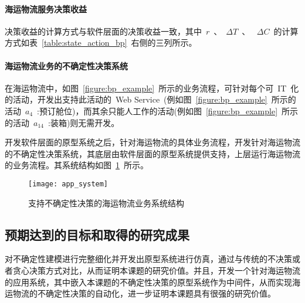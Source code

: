 \paragraph{海运物流服务决策收益}

决策收益的计算方式与软件层面的决策收益一致，其中~$r$~、~$\Delta T$~、 ~$\Delta C$~的计算方式如表~\ref{table:state_action_bp}~右侧的三列所示。

%

\paragraph{海运物流业务的不确定性决策系统}

在海运物流中，如图~\ref{figure:bp_example}~所示的业务流程，可针对每个可~IT~化的活动，开发出支持此活动的~Web Service~(例如图~\ref{figure:bp_example}~所示的活动~$a_{4}$~:预订舱位)，而其余只能人工作的活动(例如图~\ref{figure:bp_example}~所示的活动~$a_{14}$~:装箱)则无需开发。

开发软件层面的原型系统之后，针对海运物流的具体业务流程，开发针对海运物流的不确定性决策系统，其底层由软件层面的原型系统提供支持，上层运行海运物流的业务流程。其系统结构如图~\ref{figure:app_system}~所示。

\begin{figure}[htbp]
    \centering
    \texttt{[image: app\_system]}
    \caption{支持不确定性决策的海运物流业务系统结构}\label{figure:app_system}
    \vspace{-1em}
\end{figure}


\subsection{预期达到的目标和取得的研究成果}

对不确定性建模进行完整细化并开发出原型系统进行仿真，通过与传统的不决策或者贪心决策方式对比，从而证明本课题的研究价值。并且，开发一个针对海运物流的应用系统，其中嵌入本课题的不确定性决策的原型系统作为中间件，从而实现海运物流的不确定性决策的自动化，进一步证明本课题具有很强的研究价值。

